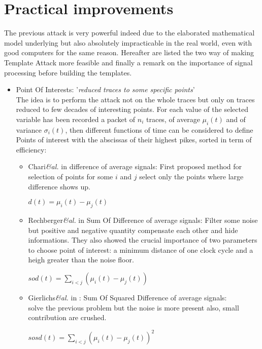 \section{Practical improvements}
The previous attack is very powerful indeed due to the elaborated mathematical model underlying
but also absolutely impracticable in the real world, even with good computers for the same reason.
Hereafter are listed the two way of making Template Attack more feasible and finally a
   remark on the importance of signal processing before building the templates.
\begin{itemize}
	\item Point Of Interests: '\textit{reduced traces to some specific points}'\\
	The idea is to perform the attack not on the whole traces but 
	only on traces reduced to few decades of interesting points. 
	For each value of the selected variable has been recorded a packet of $n_i$ 
	traces,	of average $\mu_i(t)$ and of variance $\sigma_i(t)$, then different 
	functions of time can be considered to define Points of interest with the 
	abscissas of their highest pikes, sorted in term of efficiency:	 
	\begin{itemize}
		\item Chari\textit{\&al.} in   
		difference of average signals: 
		First proposed method for selection of points for some $i$ and $j$ select only 
		the points where large difference shows up.
		\begin{center}
		$d(t) =   \mu_i(t)-\mu_j(t)  $ 
		\end{center}
		
		\item Rechberger\textit{\&al.} in  
		Sum Of Difference  of average signals:	
		Filter some noise but positive and negative quantity compensate each other and hide informations.		
		They also showed the crucial importance of two parameters to choose point of interest: 
		a minimum distance of one clock cycle and a heigh greater than the noise floor.
		\begin{center}
		$sod(t) =  \sum \limits_{ i < j }  ( \mu_i(t)-\mu_j(t) )	 $
		\end{center}
	
		\item Gierlichs\textit{\&al.} in :
		 Sum Of Squared Difference of average signals:\\
		solve the previous problem but the noise is more present also, small contribution are crushed.
		\begin{center}
		$sosd(t) =  \sum \limits_{ i < j }   ( \mu_i(t)-\mu_j(t) )^2	 $
		\end{center}
		

\end{itemize}
\end{itemize}
